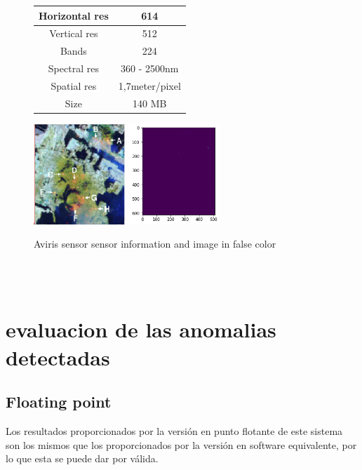 \begin{figure}[!ht]
    \begin{tabular}[b]{c|c}\hline
      Horizontal res & 614 \\ \hline
      Vertical res & 512 \\ \hline
      Bands & 224 \\ \hline
      Spectral res & 360 - 2500nm \\ \hline
      Spatial res & 1,7meter/pixel \\ \hline
      Size & 140 MB\\ \hline
    \end{tabular}
\includegraphics[height=1.5in]{figures/wtc_bad.png}
\includegraphics[height=1.5in]{figures/wtc_rx.png}
    \caption{Aviris sensor sensor information and image in false color}
  \end{figure}
\\
\\
\section{evaluacion de las anomalias detectadas}
\subsection{Floating point}
Los resultados proporcionados por la versión en punto flotante de este sistema son los mismos que los proporcionados por la versión en software equivalente, por lo que esta se puede dar por válida.

